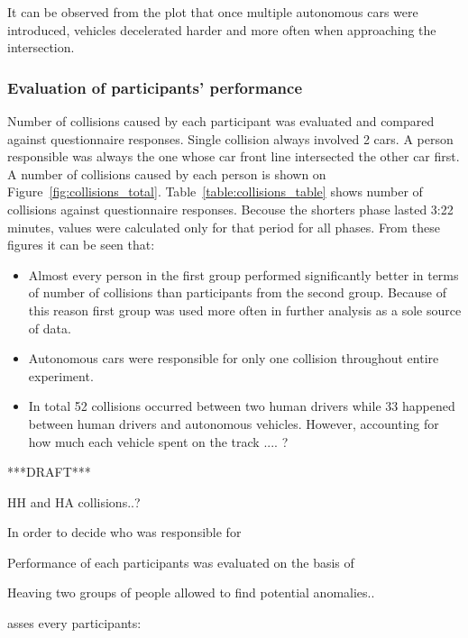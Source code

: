 \documentclass[11pt,english]{article}
\begin{document}
It can be observed from the plot that once multiple autonomous cars were introduced, vehicles decelerated harder and more often when approaching the intersection.







\subsubsection*{Evaluation of participants' performance}

Number of collisions caused by each participant was evaluated and compared against questionnaire responses. Single collision always involved 2 cars. A person responsible was always the one whose car front line intersected the other car first. A number of collisions caused by each person is shown on Figure~\ref{fig:collisions_total}. Table~\ref{table:collisions_table} shows number of collisions against questionnaire responses. Becouse the shorters phase lasted 3:22 minutes, values were calculated only for that period for all phases. From these figures it can be seen that:
\begin{itemize}
  \item Almost every person in the first group performed significantly better in terms of number of collisions than participants from the second group. Because of this reason first group was used more often in further analysis as a sole source of data.
  \item Autonomous cars were responsible for only one collision throughout entire experiment. 
  \item  In total 52 collisions occurred between two human drivers while 33 happened between human drivers and autonomous vehicles. However, accounting for how much each vehicle spent on the track .... ?
\end{itemize}

***DRAFT***

HH and HA collisions..?

In order to decide who was responsible for

Performance of each participants was evaluated on the basis of 


Heaving two groups of people allowed to find potential anomalies..

asses every participants:
\end{document}
